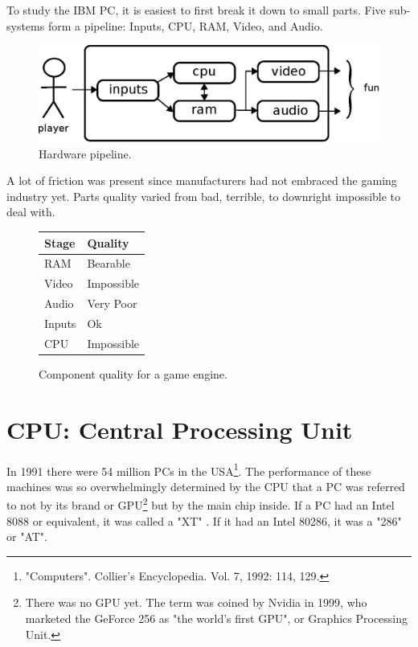 \documentclass[book.tex]{subfiles}
\begin{document}
\label{chapter_hardware}
To study the IBM PC, it is easiest to first break it down to small parts. Five sub-systems form a pipeline: Inputs, CPU, RAM, Video, and Audio.\\
\begin{figure}[H]
\centering
\includegraphics[width=\textwidth]{imgs/drawings/fun_pipeline.eps}
\caption{Hardware pipeline.}
\label{fig:digraph}
\end{figure}

A lot of friction was present since manufacturers had not embraced the gaming industry yet. Parts quality varied from  bad, terrible, to downright impossible to deal with.\\
\par

\begin{figure}[H]
\centering
\begin{tabularx}{\textwidth}{ X X  }
  \toprule
  \textbf{Stage} & \textbf{Quality} \\ \bottomrule
  RAM & Bearable \\ 
  Video & Impossible \\ 
  Audio & Very Poor \\ 
  Inputs & Ok \\ 
  CPU & Impossible \\ \bottomrule
\end{tabularx}
\caption{Component quality for a game engine.}
\end{figure}



\section{CPU: Central Processing Unit}
  


  In 1991 there were 54 million PCs in the USA\footnote{"Computers". Collier's Encyclopedia. Vol. 7, 1992: 114, 129.}. The performance of these machines was so overwhelmingly determined by the CPU that a PC was referred to not by its brand or GPU\footnote{There was no GPU yet. The term was coined by Nvidia in 1999, who marketed the GeForce 256 as "the world's first GPU", or Graphics Processing Unit.} but by the main chip inside. If a PC had an Intel 8088 or equivalent, it was called a "XT" . If it had an Intel 80286, it was a "286" or "AT".\\
\end{document}
